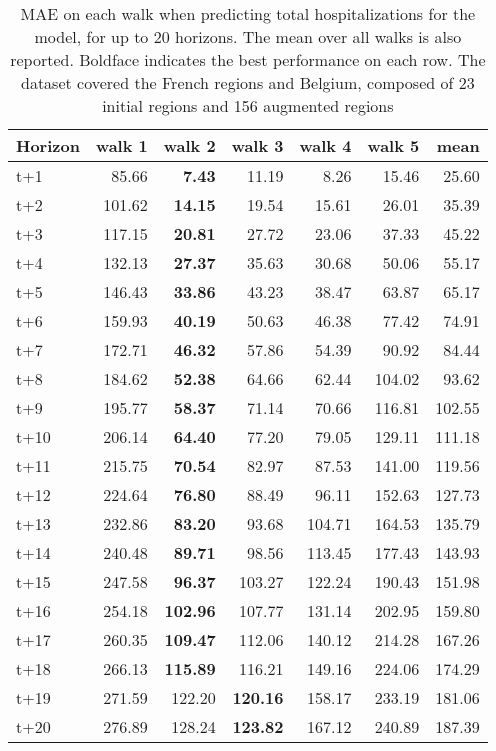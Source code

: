 \begin{table}[H]
\centering
\caption{MAE on each walk when predicting total hospitalizations for the model, for up to 20 horizons. The mean over all walks is also reported. Boldface indicates the best performance on each row. The dataset covered the French regions and Belgium, composed of 23 initial regions and 156 augmented regions }
\label{tab:MAE_walk_baseline}
\begin{tabular}{lrrrrrr}
\toprule
Horizon &  walk 1 &  walk 2 &  walk 3 &  walk 4 &  walk 5 &   mean \\
\midrule
t+1  & 85.66  & \textbf{7.43}  & 11.19  & 8.26  & 15.46  & 25.60  \\
t+2  & 101.62  & \textbf{14.15}  & 19.54  & 15.61  & 26.01  & 35.39  \\
t+3  & 117.15  & \textbf{20.81}  & 27.72  & 23.06  & 37.33  & 45.22  \\
t+4  & 132.13  & \textbf{27.37}  & 35.63  & 30.68  & 50.06  & 55.17  \\
t+5  & 146.43  & \textbf{33.86}  & 43.23  & 38.47  & 63.87  & 65.17  \\
t+6  & 159.93  & \textbf{40.19}  & 50.63  & 46.38  & 77.42  & 74.91  \\
t+7  & 172.71  & \textbf{46.32}  & 57.86  & 54.39  & 90.92  & 84.44  \\
t+8  & 184.62  & \textbf{52.38}  & 64.66  & 62.44  & 104.02  & 93.62  \\
t+9  & 195.77  & \textbf{58.37}  & 71.14  & 70.66  & 116.81  & 102.55  \\
t+10  & 206.14  & \textbf{64.40}  & 77.20  & 79.05  & 129.11  & 111.18  \\
t+11  & 215.75  & \textbf{70.54}  & 82.97  & 87.53  & 141.00  & 119.56  \\
t+12  & 224.64  & \textbf{76.80}  & 88.49  & 96.11  & 152.63  & 127.73  \\
t+13  & 232.86  & \textbf{83.20}  & 93.68  & 104.71  & 164.53  & 135.79  \\
t+14  & 240.48  & \textbf{89.71}  & 98.56  & 113.45  & 177.43  & 143.93  \\
t+15  & 247.58  & \textbf{96.37}  & 103.27  & 122.24  & 190.43  & 151.98  \\
t+16  & 254.18  & \textbf{102.96}  & 107.77  & 131.14  & 202.95  & 159.80  \\
t+17  & 260.35  & \textbf{109.47}  & 112.06  & 140.12  & 214.28  & 167.26  \\
t+18  & 266.13  & \textbf{115.89}  & 116.21  & 149.16  & 224.06  & 174.29  \\
t+19  & 271.59  & 122.20  & \textbf{120.16}  & 158.17  & 233.19  & 181.06  \\
t+20  & 276.89  & 128.24  & \textbf{123.82}  & 167.12  & 240.89  & 187.39  \\

\bottomrule
\end{tabular}
\end{table}
